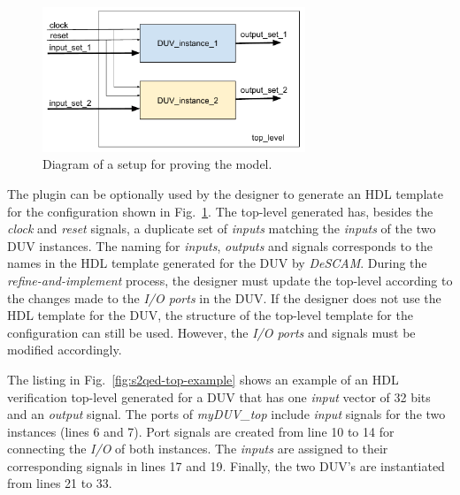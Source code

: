 \begin{figure}[htb!]
	\centering
	\includegraphics[width=0.7\textwidth]{images/top_s2qed.pdf}
	\caption{Diagram of a setup for proving the \SSQED{} model.}
	\label{fig:s2qed-top-diagram}
\end{figure}

The plugin can be optionally used by the designer to generate an HDL template for the configuration shown in Fig.~\ref{fig:s2qed-top-diagram}. The top-level generated has, besides the \textit{clock} and \textit{reset} signals, a duplicate set of \textit{inputs} matching the \textit{inputs} of the two DUV instances. The naming for \textit{inputs}, \textit{outputs} and signals corresponds to the names in the HDL template generated for the DUV by \textit{DeSCAM}. During the \textit{refine-and-implement} process, the designer must update the top-level according to the changes made to the \textit{I/O ports} in the DUV. If the designer does not use the HDL template for the DUV, the structure of the top-level template for the \SSQED{} configuration can still be used. However, the \textit{I/O ports} and signals must be modified accordingly.

The listing in Fig.~\ref{fig:s2qed-top-example} shows an example of an HDL verification top-level generated for a DUV that has one \textit{input} vector of 32 bits and an \textit{output} signal. The ports of \textit{myDUV\_top} include \textit{input} signals for the two instances (lines 6 and 7). Port signals are created from line 10 to 14 for connecting the \textit{I/O} of both instances. The \textit{inputs} are assigned to their corresponding signals in lines 17 and 19.  Finally, the two DUV’s are instantiated from lines 21 to 33.

